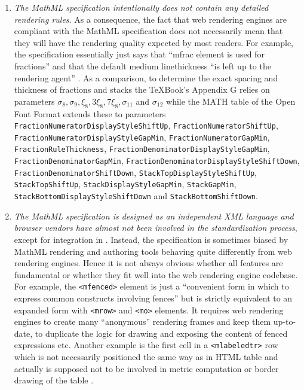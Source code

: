 \begin{enumerate}
\item {\em The MathML specification intentionally does not contain any detailed
  rendering rules}. As a consequence, the fact that web rendering engines are
  compliant with the MathML specification does not necessarily mean that they
  will have the rendering quality expected by most readers.
  For example, the specification essentially just says that
  ``mfrac element is used for fractions'' and that the default medium
  linethickness ``is left up to the rendering agent'' \cite{MathML3}.
  As a comparison, to determine the exact spacing and thickness of
  fractions and stacks the
  \TeX Book's Appendix G \cite{TeXBook} relies
  on parameters $\sigma_8, \sigma_9, \xi_8, {3\xi_8}, {7\xi_8}, \sigma_{11}$ and
  $\sigma_{12}$ while the MATH table of the Open Font Format
  \cite{OpenFontFormat3} extends these to parameters
  {\tt FractionNumeratorDisplayStyleShiftUp},
  {\tt FractionNumeratorShiftUp},
  {\tt FractionNumeratorDisplayStyleGapMin},
  {\tt FractionNumeratorGapMin},
  {\tt FractionRuleThickness},
  {\tt FractionDenominatorDisplayStyleGapMin},
  {\tt FractionDenominatorGapMin},
  {\tt FractionDenominatorDisplayStyleShiftDown},
  {\tt FractionDenominatorShiftDown},
  {\tt StackTopDisplayStyleShiftUp},
  {\tt StackTopShiftUp},
  {\tt StackDisplayStyleGapMin},
  {\tt StackGapMin},
  {\tt StackBottomDisplayStyleShiftDown} and
  {\tt StackBottomShiftDown}.
\item {\em The MathML specification is designed as an independent
  XML language and browser vendors have almost not been involved in the
  standardization process},
  except for integration in \cite{HTML5}.
  Instead, the specification is sometimes biased by MathML rendering and
  authoring tools behaving quite differently from web rendering engines.
  Hence it is not always obvious whether all features are fundamental or
  whether they fit well into the web rendering engine codebase.
  For example, the {\tt <mfenced>} element is just a
  ``convenient form in which to express common constructs involving fences''
  but is strictly equivalent to an expanded form with {\tt <mrow>} and
  {\tt <mo>} elements. It requires web rendering engines
  to create many ``anonymous''
  rendering frames and keep them up-to-date, to duplicate the logic
  for drawing and exposing the content of fenced expressions etc.
  Another example is the first cell in a
  {\tt <mlabeledtr>} row which is not necessarily positioned the same way as
  in HTML table and actually is supposed not to be involved in metric
  computation or border drawing of the table \cite{MathML3}.
\end{enumerate}

